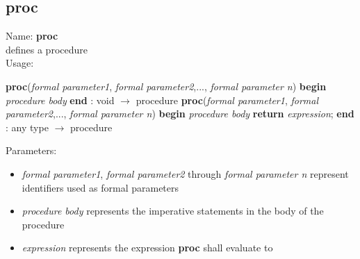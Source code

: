 \subsection{proc}
\label{labproc}
\noindent Name: \textbf{proc}\\
defines a \sollya procedure\\
\noindent Usage: 
\begin{center}
\textbf{proc}(\emph{formal parameter1}, \emph{formal parameter2},..., \emph{formal parameter n}) \textbf{begin} \emph{procedure body} \textbf{end} : \textsf{void} $\rightarrow$ \textsf{procedure}
\textbf{proc}(\emph{formal parameter1}, \emph{formal parameter2},..., \emph{formal parameter n}) \textbf{begin} \emph{procedure body} \textbf{return} \emph{expression}; \textbf{end} : \textsf{any type} $\rightarrow$ \textsf{procedure}
\end{center}
Parameters: 
\begin{itemize}
\item \emph{formal parameter1}, \emph{formal parameter2} through \emph{formal parameter n} represent identifiers used as formal parameters
\item \emph{procedure body} represents the imperative statements in the body of the procedure
\item \emph{expression} represents the expression \textbf{proc} shall evaluate to
\end{itemize}
